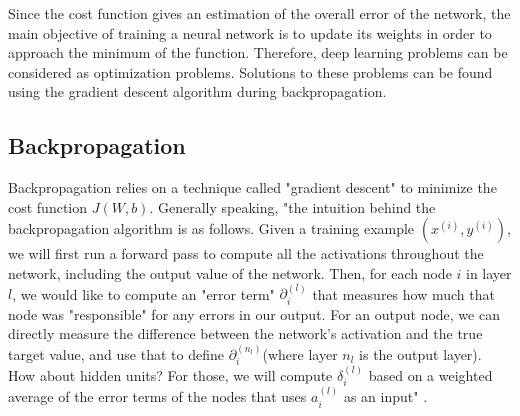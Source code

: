 Since the cost function gives an estimation of the overall error of the network, the main objective of training a neural network is to update its weights in order to approach the minimum of the function. Therefore, deep learning problems can be considered as optimization problems. Solutions to these problems can be found using the gradient descent algorithm during backpropagation.

\subsection{Backpropagation}
Backpropagation relies on a technique called "gradient descent" to minimize the cost function $J(W, b)$. Generally speaking, "the intuition behind the backpropagation algorithm is as follows. Given a training example $(x^{(i)}, y^{(i)})$, we will first run a forward pass to compute all the activations throughout the network, including the output value of the network. Then, for each node $i$ in layer $l$, we would like to compute an "error term" $\partial^{(l)}_{i}$ that measures how much that node was "responsible" for any errors in our output. For an output node, we can directly measure the difference between the network’s activation and the true target value, and use that to define $\partial^{(n_{l})}_{i}$(where layer $n_{l}$ is the output layer). How about hidden units? For those, we will compute $\delta^{(l)}_{i}$ based on a weighted average of the error terms of the nodes that uses $a^{(l)}_{i}$ as an input" \cite{24}.

